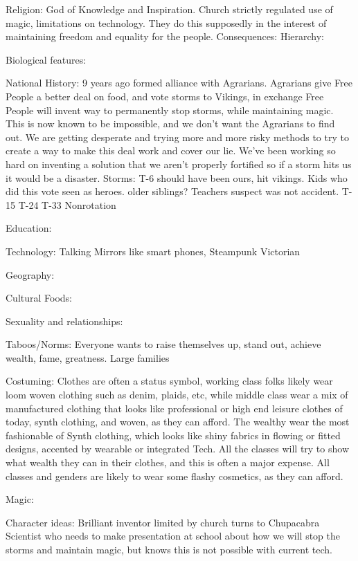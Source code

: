 \documentclass[blue]{GL2020}
\begin{document}
Religion:		God of Knowledge and Inspiration.  Church strictly regulated use of magic, limitations on technology.  They do this supposedly in the interest of maintaining freedom and equality for the people.  
	Consequences:
	Hierarchy:
	
	
Biological features:

National History:		9 years ago formed alliance with Agrarians.  Agrarians give Free People a better deal on food, and vote storms to Vikings, in exchange Free People will invent way to permanently stop storms, while maintaining magic.  This is now known to be impossible, and we don't want the Agrarians to find out.  We are getting desperate and trying more and more risky methods to try to create a way to make this deal work and cover our lie.  We've been working so hard on inventing a solution that we aren't properly fortified so if a storm hits us it would be a disaster.
	Storms:		T-6 should have been ours, hit vikings.  Kids who did this vote seen as heroes.  older siblings?  Teachers suspect was not accident.
						T-15
						T-24
						T-33
						Nonrotation
	
Education:

Technology:		Talking Mirrors like smart phones, Steampunk Victorian

Geography:

Cultural Foods:

Sexuality and relationships:

Taboos/Norms:		Everyone wants to raise themselves up, stand out, achieve wealth, fame, greatness.  Large families 

Costuming:		Clothes are often a status symbol, working class folks likely wear loom woven clothing such as denim, plaids, etc, while middle class wear a mix of manufactured clothing that looks like professional or high end leisure clothes of today, synth clothing, and woven, as they can afford.  The wealthy wear the most fashionable of Synth clothing, which looks like shiny fabrics in flowing or fitted designs, accented by wearable or integrated Tech.  All the classes will try to show what wealth they can in their clothes, and this is often a major expense.  All classes and genders are likely to wear some flashy cosmetics, as they can afford.

Magic:

Character ideas:  Brilliant inventor limited by church turns to Chupacabra
									Scientist who needs to make presentation at school about how we will stop the storms and
										maintain magic, but knows this is not possible with current tech.
									
\end{document}
